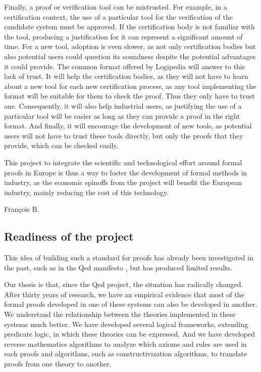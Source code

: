 Finally, a proof or verification tool can be mistrusted. For example,
in a certification context, the use of a particular tool for the
verification of the candidate system must be approved. If the
certification body is not familiar with the tool, producing a
justification for it can represent a significant amount of time. For
a new tool, adoption is even slower, as not only certification
bodies but also potential users could question its soundness despite
the potential advantages it could provide. The common format offered
by {\sf Logipedia} will answer to this lack of trust. It will help
the certification bodies, as they will not have to learn about a new
tool for each new certification process, as any tool implementing
the format will be suitable for them to check the proof. Thus they
only have to trust one. Consequently, it will also help industrial
users, as justifying the use of a particular tool will be easier as
long as they can provide a proof in the right format. And finally, it
will encourage the development of new tools, as potential users will
not have to trust these tools directly, but only the proofs that they
provide, which can be checked easily.

This project to integrate the scientific and technological effort
around formal proofs in Europe is thus a way to foster the
development of formal methods in industry, as the economic spinoffs
from the project will benefit the European industry, mainly reducing
the cost of this technology.

{\color{red}
François B.}

\subsection{Readiness of the project}

This idea of building such a standard for proofs has already been
investigated in the past, such as in the Qed manifesto \cite{Qed94}, but
has produced limited results.

Our thesis is that, since the
Qed project, the situation has radically changed. After
thirty years of research, we have an empirical evidence that most of
the formal proofs developed in one of these systems can also be
developed in another. We understand the relationship between the
theories implemented in these systems much better. We have developed
several logical frameworks, extending predicate logic, in which these
theories can be expressed. And we have developed reverse mathematics
algorithms to analyze which axioms and rules are used in each proofs
and algorithms, such as constructivization algorithms, to translate
proofs from one theory to another.

